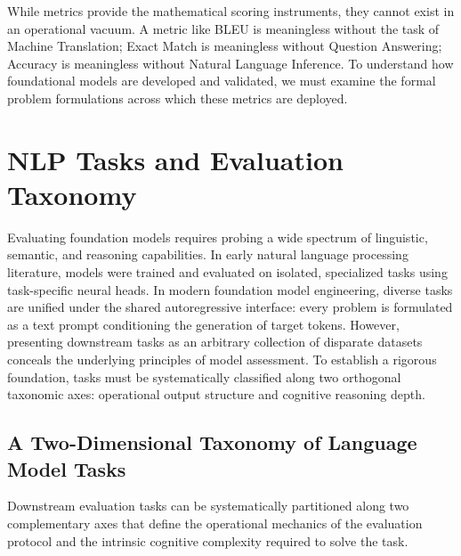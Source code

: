 \documentclass[../../../main.tex]{subfiles}
\begin{document}
While metrics provide the mathematical scoring instruments, they cannot exist in an operational vacuum. A metric like BLEU is meaningless without the task of Machine Translation; Exact Match is meaningless without Question Answering; Accuracy is meaningless without Natural Language Inference. To understand how foundational models are developed and validated, we must examine the formal problem formulations across which these metrics are deployed.

\clearpage

\section{NLP Tasks and Evaluation Taxonomy}
\label{sec:evaluation_tasks}

Evaluating foundation models requires probing a wide spectrum of linguistic, semantic, and reasoning capabilities. In early natural language processing literature, models were trained and evaluated on isolated, specialized tasks using task-specific neural heads. In modern foundation model engineering, diverse tasks are unified under the shared autoregressive interface: every problem is formulated as a text prompt conditioning the generation of target tokens. However, presenting downstream tasks as an arbitrary collection of disparate datasets conceals the underlying principles of model assessment. To establish a rigorous foundation, tasks must be systematically classified along two orthogonal taxonomic axes: operational output structure and cognitive reasoning depth.

\subsection{A Two-Dimensional Taxonomy of Language Model Tasks}
\label{subsec:task_taxonomy}

Downstream evaluation tasks can be systematically partitioned along two complementary axes that define the operational mechanics of the evaluation protocol and the intrinsic cognitive complexity required to solve the task.
\end{document}
